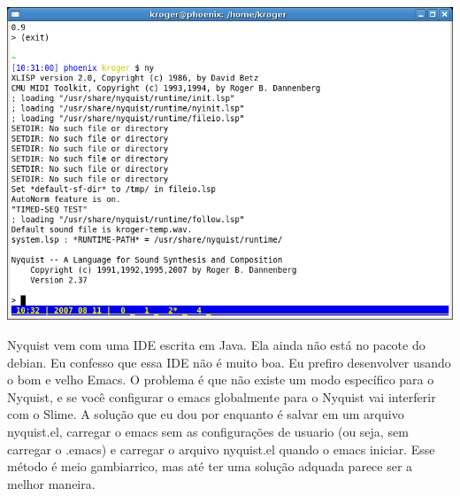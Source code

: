 \documentclass[brazil]{book}
\begin{document}
\includegraphics{ny1}

Nyquist vem com uma IDE escrita em Java. Ela ainda não está no pacote
do debian. Eu confesso que essa IDE não é muito boa. Eu prefiro
desenvolver usando o bom e velho Emacs. O problema é que não existe um
modo específico para o Nyquist, e se você configurar o emacs
globalmente para o Nyquist vai interferir com o Slime. A solução que
eu dou por enquanto é salvar 
em um arquivo nyquist.el, carregar o emacs sem as configurações de
usuario (ou seja, sem carregar o .emacs) e carregar o arquivo
nyquist.el quando o emacs iniciar. Esse método é meio gambiarrico, mas
até ter uma solução adquada parece ser a melhor maneira.
\end{document}
